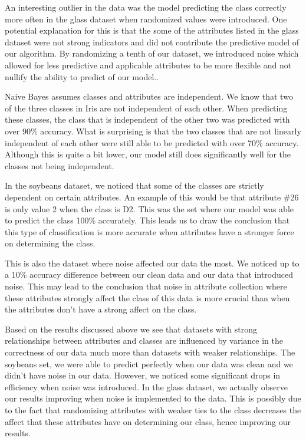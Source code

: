 \documentclass[twoside,11pt]{article}
\begin{document}
An interesting outlier in the data was the model predicting the class correctly more often in the glass dataset when randomized values were introduced. One potential explanation for this is that the some of the attributes listed in the glass dataset were not strong indicators and did not contribute the predictive model of our algorithm. By randomizing a tenth of our dataset, we introduced noise which allowed for less predictive and applicable attributes to be more flexible and not nullify the ability to predict of our model.\citep{ger87}.

Naive Bayes assumes classes and attributes are independent. We know that two of the three classes in Iris\citep{fis88} are not independent of each other. When predicting these classes, the class that is independent of the other two was predicted with over 90\% accuracy. What is surprising is that the two classes that are not linearly independent of each other were still able to be predicted with over 70\% accuracy. Although this is quite a bit lower, our model still does significantly well for the classes not being independent.

In the soybeans dataset\citep{mic87}, we noticed that some of the classes are strictly dependent on certain attributes. An example of this would be that attribute \#26 is only value 2 when the class is D2. This was the set where our model was able to predict the class 100\% accurately. This leads us to draw the conclusion that this type of classification is more accurate when attributes have a stronger force on determining the class. 

This is also the dataset where noise affected our data the most. We noticed up to a 10\% accuracy difference between our clean data and our data that introduced noise. This may lead to the conclusion that noise in attribute collection where these attributes strongly affect the class of this data is more crucial than when the attributes don't have a strong affect on the class. 

Based on the results discussed above we see that datasets with strong relationships between attributes and classes are influenced by variance in the correctness of our data much more than datasets with weaker relationships. The soybeans set, we were able to predict perfectly when our data was clean and we didn't have noise in our data. However, we noticed some significant drops in efficiency when noise was introduced. In the glass dataset, we actually observe our results improving when noise is implemented to the data. This is possibly due to the fact that randomizing attributes with weaker ties to the class decreases the affect that these attributes have on determining our class, hence improving our results.
\end{document}
